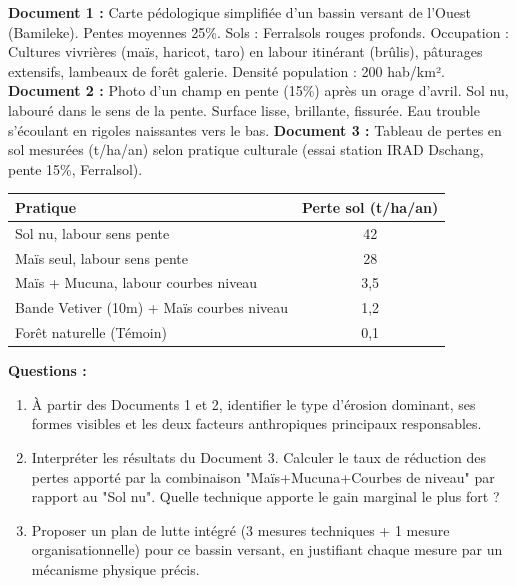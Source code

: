 \documentclass[11pt]{article}
\begin{document}
\begin{exercice}
\textbf{Document 1 :} Carte pédologique simplifiée d'un bassin versant de l'Ouest (Bamileke). Pentes moyennes 25\%. Sols : Ferralsols rouges profonds. Occupation : Cultures vivrières (maïs, haricot, taro) en labour itinérant (brûlis), pâturages extensifs, lambeaux de forêt galerie. Densité population : 200 hab/km².
\textbf{Document 2 :} Photo d'un champ en pente (15\%) après un orage d'avril. Sol nu, labouré dans le sens de la pente. Surface lisse, brillante, fissurée. Eau trouble s'écoulant en rigoles naissantes vers le bas.
\textbf{Document 3 :} Tableau de pertes en sol mesurées (t/ha/an) selon pratique culturale (essai station IRAD Dschang, pente 15\%, Ferralsol).
\begin{center}
\begin{tabular}{|l|c|}\hline
\textbf{Pratique} & \textbf{Perte sol (t/ha/an)} \\ \hline
Sol nu, labour sens pente & 42 \\ \hline
Maïs seul, labour sens pente & 28 \\ \hline
Maïs + Mucuna, labour courbes niveau & 3,5 \\ \hline
Bande Vetiver (10m) + Maïs courbes niveau & 1,2 \\ \hline
Forêt naturelle (Témoin) & 0,1 \\ \hline
\end{tabular}
\end{center}
\textbf{Questions :}
\begin{enumerate}
    \item À partir des Documents 1 et 2, identifier le type d'érosion dominant, ses formes visibles et les deux facteurs anthropiques principaux responsables.
    \item Interpréter les résultats du Document 3. Calculer le taux de réduction des pertes apporté par la combinaison "Maïs+Mucuna+Courbes de niveau" par rapport au "Sol nu". Quelle technique apporte le gain marginal le plus fort ?
    \item Proposer un plan de lutte intégré (3 mesures techniques + 1 mesure organisationnelle) pour ce bassin versant, en justifiant chaque mesure par un mécanisme physique précis.
\end{enumerate}
\end{exercice}
\end{document}
